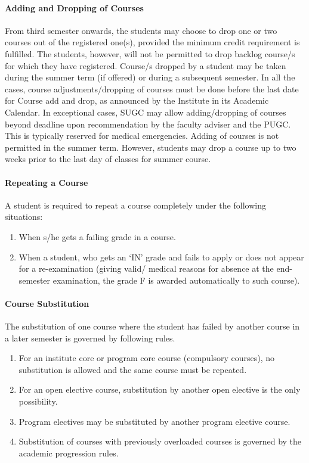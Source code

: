 \paragraph{Adding and Dropping of Courses} From third semester onwards, the students may choose to drop one or two courses out of the registered one(s), provided the minimum credit requirement is fulfilled. The students, however, will not be permitted to drop backlog course/s for which they have registered. Course/s dropped by a student may be taken during the summer term (if offered) or during a subsequent semester. In all the cases, course adjustments/dropping of courses must be done before the last date for Course add and drop, as announced by the Institute in its Academic Calendar. In exceptional cases, SUGC may allow adding/dropping of courses beyond deadline upon recommendation by the faculty adviser and the PUGC. This is typically reserved for medical emergencies. Adding of courses is not permitted in the summer term. However, students may drop a course up to two weeks prior to the last day of classes for summer course.

\paragraph{Repeating a Course} A student is required to repeat a course completely under the following situations: 

\begin{enumerate}[leftmargin=15mm]
    \item When s/he gets a failing grade in a course. 
    \item When a student, who gets an ‘IN' grade and fails to apply or does not appear for a re-examination (giving valid/ medical reasons for absence at the end-semester examination, the grade F is awarded automatically to such course).
\end{enumerate}

\paragraph{Course Substitution} The substitution of one course where the student has failed by another course in a later semester is governed by following rules.

\begin{enumerate}[leftmargin=15mm]
    \item For an institute core or program core course (compulsory courses), no substitution is allowed and the same course must be repeated. 
    \item For an open elective course, substitution by another open elective is the only possibility. 
    \item Program electives may be substituted by another program elective course.
    \item Substitution of courses with previously overloaded courses is governed by the academic progression rules.
\end{enumerate}

